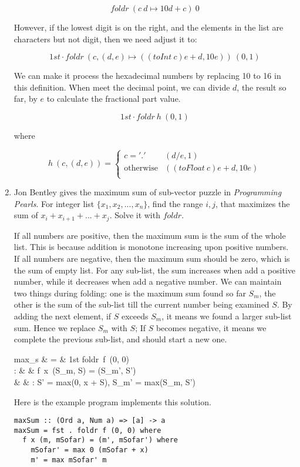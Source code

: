 \documentclass[UTF8]{article}
\begin{document}
\begin{enumerate}
\[
foldr\ (c\ d \mapsto 10d + c)\ 0
\]

However, if the lowest digit is on the right, and the elements in the list are characters but not digit, then we need adjust it to:

\[
1st \cdot foldr\ (c, (d, e) \mapsto ((toInt\ c)e + d, 10e))\ (0, 1)
\]

We can make it process the hexadecimal numbers by replacing 10 to 16 in this definition. When meet the decimal point, we can divide $d$, the result so far, by $e$ to calculate the fractional part value.

\[
1st \cdot foldr\ h\ (0, 1)
\]

where

\[
h\ (c, (d, e)) = \begin{cases}
c = '.' & (d / e, 1) \\
\text{otherwise} & ((toFloat\ c)e + d, 10e) \\
\end{cases}
\]

\item Jon Bentley gives the maximum sum of sub-vector puzzle in {\em Programming Pearls}. For integer list $\{x_1, x_2, ..., x_n\}$, find the range $i, j$, that maximizes the sum of $x_i + x_{i+1} + ... + x_j$. Solve it with $foldr$.

If all numbers are positive, then the maximum sum is the sum of the whole list. This is because addition is monotone increasing upon positive numbers. If all numbers are negative, then the maximum sum should be zero, which is the sum of empty list. For any sub-list, the sum increases when add a positive number, while it decreases when add a negative number. We can maintain two things during folding: one is the maximum sum found so far $S_m$, the other is the sum of the sub-list till the current number being examined $S$. By adding the next element, if $S$ exceeds $S_m$, it means we found a larger sub-list sum. Hence we replace $S_m$ with $S$; If $S$ becomes negative, it means we complete the previous sub-list, and should start a new one.

\blre
max_s & = & 1st \cdot foldr\ f\ (0, 0) \\
: & & f\ x\ (S_m, S) = (S_m', S') \\
& & :  S' = max(0, x + S), S_m' = max(S_m, S') \\
\elre

Here is the example program implements this solution.

\lstset{frame=single}
\begin{lstlisting}
maxSum :: (Ord a, Num a) => [a] -> a
maxSum = fst . foldr f (0, 0) where
  f x (m, mSofar) = (m', mSofar') where
    mSofar' = max 0 (mSofar + x)
    m' = max mSofar' m
\end{lstlisting}


\end{enumerate}
\end{document}
